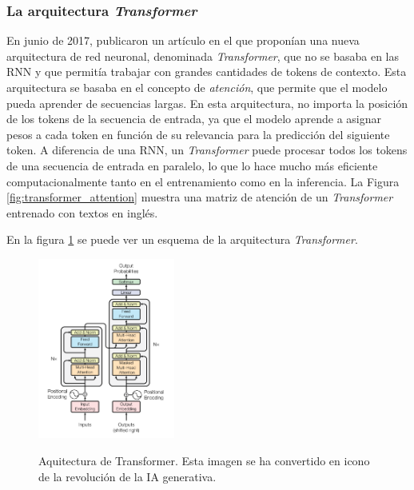 \subsubsection{La arquitectura \textit{Transformer}}
En junio de 2017, \citeauthor{vaswaniAttentionAllYou2017} publicaron un artículo \citep{vaswaniAttentionAllYou2017} en el que proponían una nueva arquitectura de red neuronal, denominada \textit{Transformer}, que no se basaba en las RNN y que permitía trabajar con grandes cantidades de tokens de contexto. Esta arquitectura se basaba en el concepto de \textit{atención}, que permite que el modelo pueda aprender de secuencias largas. En esta arquitectura, no importa la posición de los tokens de la secuencia de entrada, ya que el modelo aprende a asignar pesos a cada token en función de su relevancia para la predicción del siguiente token. A diferencia de una RNN, un \textit{Transformer} puede procesar todos los tokens de una secuencia de entrada en paralelo, lo que lo hace mucho más eficiente computacionalmente tanto en el entrenamiento como en la inferencia. La Figura \ref{fig:transformer_attention} muestra una matriz de atención de un \textit{Transformer} entrenado con textos en inglés.

En la figura \ref{fig:transformer_architecture} se puede ver un esquema de la arquitectura \textit{Transformer}.

\begin{figure}[H]
    \caption[Aquitectura de Transformer]{Aquitectura de Transformer. Esta imagen se ha convertido en icono de la revolución de la IA generativa.}
    \centering
    \includegraphics[width=0.4\textwidth]{./figuras/Transformer_architecture.png}
    \label{fig:transformer_architecture}
\end{figure}

